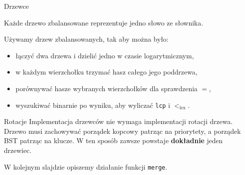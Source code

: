 \documentclass[polish]{beamer}
\begin{document}
\begin{frame}{Drzewce}
    \begin{alertblock}{}
        Każde drzewo zbalansowane reprezentuje jedno słowo ze słownika. 
    \end{alertblock}
    \pause
    Używamy drzew zbalansowanych, tak aby można było: \pause
    \begin{itemize}
        \item łączyć dwa drzewa i dzielić jedno w czasie logarytmicznym, \pause
        \item w każdym wierzchołku trzymać hasz całego jego poddrzewa, \pause
        \item porównywać hasze wybranych wierzchołków dla sprawdzenia $=$, \pause
        \item wyszukiwać binarnie po wyniku, aby wyliczać \texttt{lcp} i $<_{\text{lex}}$.
    \end{itemize}
    \pause
    \begin{block}{Rotacje}
        Implementacja drzewców nie wymaga implementacji rotacji drzewa. Drzewo musi zachowywać porządek kopcowy patrząc na priorytety, a porządek BST patrząc na klucze. W ten sposób zawsze powstaje \textbf{dokładnie} jeden drzewiec.
    \end{block}
    \pause
    \begin{example}
        W kolejnym slajdzie opiszemy działanie funkcji \texttt{merge}.
    \end{example}
\end{frame}

\newsavebox{\sixthbox}
\newsavebox{\seventhbox}
\end{document}
